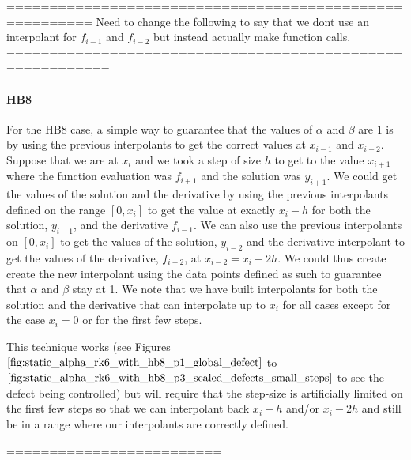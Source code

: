 \documentclass{article}
\begin{document}
========================================================
Need to change the following to say that we dont use an interpolant for $f_{i - 1}$ and $f_{i-2}$ but instead actually make function calls.
==========================================================

\paragraph{HB8} For the HB8 case, a simple way to guarantee that the values of $\alpha$ and $\beta$ are 1 is by using the previous interpolants to get the correct values at $x_{i - 1}$ and $x_{i - 2}$. Suppose that we are at $x_i$ and we took a step of size $h$ to get to the value $x_{i + 1}$ where the function evaluation was $f_{i + 1}$ and the solution was $y_{i + 1}$. We could get the values of the solution and the derivative by using the previous interpolants defined on the range $[0, x_i]$ to get the value at exactly $x_i - h$ for both the solution, $y_{i - 1}$, and the derivative $f_{i - 1}$.  We can also use the previous interpolants on $[0, x_i]$ to get the values of the solution, $y_{i-2}$ and the derivative interpolant to get the values of the derivative, $f_{i - 2}$, at $x_{i-2} = x_i - 2h$. We could thus create create the new interpolant using the data points defined as such to guarantee that $\alpha$ and $\beta$ stay at 1. We note that we have built interpolants for both the solution and the derivative that  can interpolate up to $x_i$ for all cases except for the case $x_i = 0$ or for the first few steps.

This technique works (see Figures $\ref{fig:static_alpha_rk6_with_hb8_p1_global_defect}$ to $\ref{fig:static_alpha_rk6_with_hb8_p3_scaled_defects_small_steps}$ to see the defect being controlled) but will require that the step-size is artificially limited on the first few steps so that we can interpolant back $x_i - h$ and/or $x_i - 2h$ and still be in a range where our interpolants are correctly defined. 

=========================
\end{document}
